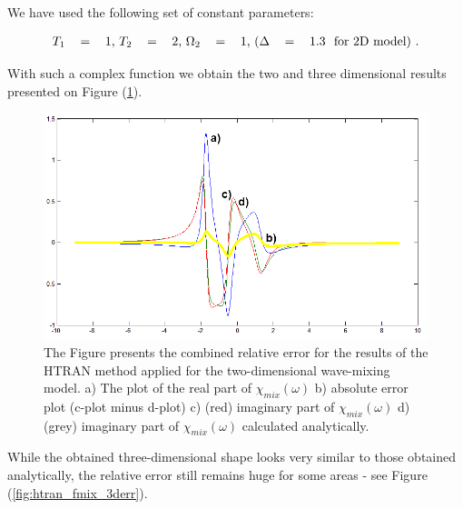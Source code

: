 \documentclass[12pt,twoside,a4paper]{article}
\numberwithin{equation}{subsection}
\numberwithin{figure}{subsection}
\begin{document}
We have used the following set of constant parameters:

\begin{equation} \label{eq:htran_mix_parameters}
  \begin{tabular}{r r l  r r l  r r l r r l}
    $T_1$      & = & $1$, 
    $T_2$      & = & $2$, 
    $\Omega_2$ & = & $1$, 
    ($\Delta$  & = & $1.3$ \ \text {for 2D model) .} \\
  \end{tabular}
\end{equation}

With such a complex function we obtain the two and three dimensional results presented on Figure (\ref{fig:htran_mix_2d}).
 
\begin{figure}
  \includegraphics[width=150mm]{img/htran_fmix_2d.png}
  \caption{The Figure presents the combined relative error for the results of the HTRAN method applied for the two-dimensional wave-mixing model.
   a) The plot of the real part of ${\chi_{mix}}(\omega )$
   b) absolute error plot (c-plot minus d-plot)
   c) (red) imaginary part of  ${\chi_{mix}}(\omega )$
   d) (grey) imaginary part of ${\chi_{mix}}(\omega )$ calculated analytically.
   \label{fig:htran_mix_2d} }
\end{figure}

While the obtained three-dimensional shape looks very similar to those obtained analytically, the relative error still remains huge for some areas - see Figure (\ref{fig:htran_fmix_3derr}).
\end{document}
